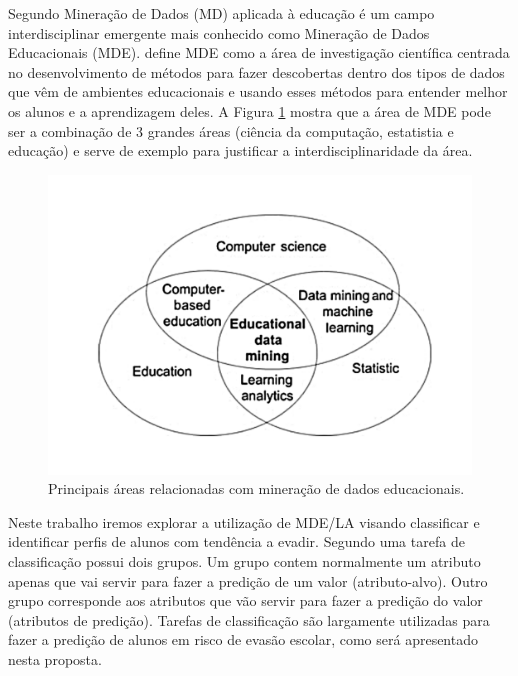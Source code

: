 \documentclass[diss,capa]{texufpel}
\begin{document}
Segundo \citet{Koedinger2008} Mineração de Dados (MD) aplicada à educação é um campo interdisciplinar emergente mais conhecido como Mineração de Dados Educacionais (MDE).
\citet{baker2010data} define MDE como a área de investigação científica centrada no desenvolvimento de métodos para fazer descobertas dentro dos tipos de dados que vêm de ambientes educacionais e usando esses métodos para entender melhor os alunos e a aprendizagem deles.
A Figura \ref{fig:areas-relacionadas-mde} mostra que a área de MDE pode ser a combinação de 3 grandes áreas (ciência da computação, estatistia e educação) e serve de exemplo para justificar a interdisciplinaridade da área.

\begin{figure}[htbp]
    \centering \includegraphics[scale=.4]{imagens/areas-edm.pdf}
    \caption{Principais áreas relacionadas com mineração de dados educacionais. \cite{Koedinger2008}}
    \label{fig:areas-relacionadas-mde}
\end{figure}

Neste trabalho iremos explorar a utilização de MDE/LA visando classificar e identificar perfis de alunos com tendência a evadir.
Segundo \citet{goldschmidt2015data} uma tarefa de classificação possui dois grupos.
Um grupo contem normalmente um atributo apenas que vai servir para fazer a predição de um valor (atributo-alvo).
Outro grupo corresponde aos atributos que vão servir para fazer a predição do valor (atributos de predição).
Tarefas de classificação são largamente utilizadas para fazer a predição de alunos em risco de evasão escolar, como será apresentado nesta proposta.
\end{document}
